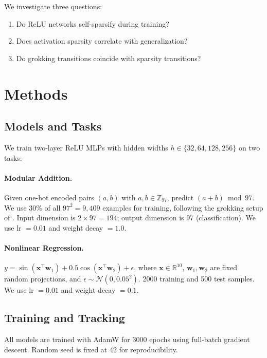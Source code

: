 \documentclass[11pt,a4paper]{article}
\begin{document}
We investigate three questions:
\begin{enumerate}
  \item Do ReLU networks self-sparsify during training?
  \item Does activation sparsity correlate with generalization?
  \item Do grokking transitions coincide with sparsity transitions?
\end{enumerate}

\section{Methods}

\subsection{Models and Tasks}

We train two-layer ReLU MLPs with hidden widths $h \in \{32, 64, 128, 256\}$
on two tasks:

\paragraph{Modular Addition.}
Given one-hot encoded pairs $(a, b)$ with $a, b \in \mathbb{Z}_{97}$,
predict $(a + b) \bmod 97$. We use 30\% of all $97^2 = 9{,}409$ examples
for training, following the grokking setup of \citet{power2022grokking}.
Input dimension is $2 \times 97 = 194$; output dimension is 97
(classification). We use lr $= 0.01$ and weight decay $= 1.0$.

\paragraph{Nonlinear Regression.}
$y = \sin(\mathbf{x}^\top \mathbf{w}_1) + 0.5\cos(\mathbf{x}^\top \mathbf{w}_2) + \epsilon$,
where $\mathbf{x} \in \mathbb{R}^{10}$, $\mathbf{w}_1, \mathbf{w}_2$ are
fixed random projections, and $\epsilon \sim \mathcal{N}(0, 0.05^2)$.
2000 training and 500 test samples. We use lr $= 0.01$ and weight
decay $= 0.1$.

\subsection{Training and Tracking}

All models are trained with AdamW for 3000 epochs using full-batch
gradient descent. Random seed is fixed at 42 for reproducibility.
\end{document}
